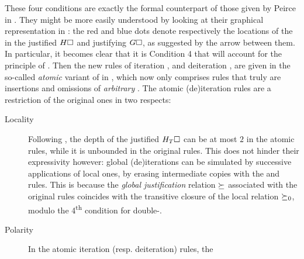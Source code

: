 \begin{scope}
\begin{scope}
These four conditions are exactly the formal counterpart of those given by
Peirce in \cite{peirce_prolegomena_1906}. They might be more easily understood
by looking at their graphical representation in :
the red and blue dots denote respectively the locations of the  in the
justified  $H\square$ and justifying  $G\square$, as suggested by the
arrow between them. In particular, it becomes clear that it is Condition 4 that
will account for the principle of . Then the new rules of
iteration ,  and deiteration ,
 are given in the so-called \emph{atomic} variant  of
 in , which now only comprises rules that
truly are insertions and omissions of \emph{arbitrary} . The atomic (de)iteration
rules are a restriction of the original ones in two respects:
\begin{description}
  \item[Locality] Following , the depth of the
  justified  $H_T\square$ can be at most $2$ in the atomic rules, while it
  is unbounded in the original rules. This does not hinder their expressivity
  however: global (de)iterations can be simulated by successive applications of
  local ones, by erasing intermediate copies with the  and 
  rules. This is because the \emph{global justification} relation $\mathbin{\succeq}$
  associated with the original rules coincides with the transitive closure of
  the local relation $\mathbin{\succeq_0}$, modulo the 4\textsuperscript{th} condition for
  double-.
  \item[Polarity] In the atomic iteration (resp. deiteration) rules, the

\end{description}
\end{scope}
\end{scope}
